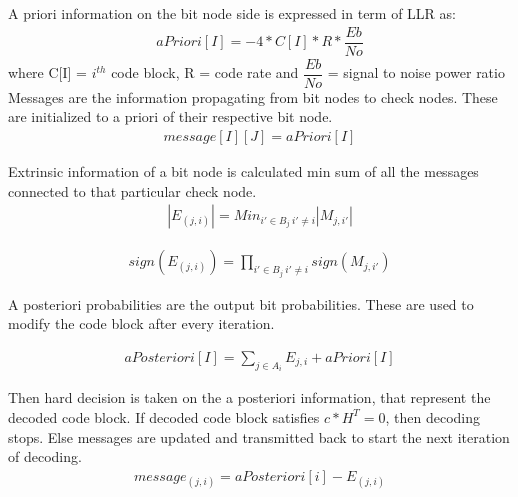 A priori information on the bit node side is expressed in term of LLR as: 
\begin{align}  aPriori[I] = -4 * C[I] * R * \dfrac{Eb}{No} 
 \end{align}
where C[I] = $i^{th}$ code block, R = code rate and 
$\dfrac{Eb}{No}$ = signal to noise power ratio\\
	
Messages are the information propagating from bit nodes to check nodes.
These are initialized to a priori of their respective bit node.	
\begin{align} message[I][J] = aPriori[I] 
 \end{align}
 
Extrinsic information of a bit node is calculated min sum of all the messages connected to 
	that particular check node. 
\begin{align} |E_{(j,i)}| =  Min_{i'\in B_j \ i'\neq i }|M_{j,i'}|   
 \end{align}

\begin{align} sign({E_{(j,i)}}) =  \prod_{i'\in B_j \ i'\neq i }sign(M_{j,i'})   
 \end{align}
 
A posteriori probabilities are the output bit probabilities.
These are used to modify the code block after every iteration.

\begin{align}  aPosteriori[I] = \sum_{j\in A_i} E_{j,i} + aPriori[I] 
 \end{align}
	
Then hard decision is taken on the a posteriori information, that represent the decoded code block.
If decoded code block satisfies $c*H^{T} = 0 $, then decoding stops. Else messages are updated and transmitted back to start the next iteration of decoding.
\begin{align}   message_{(j,i)} = aPosteriori[i] - E_{(j,i)}  
 \end{align}	



